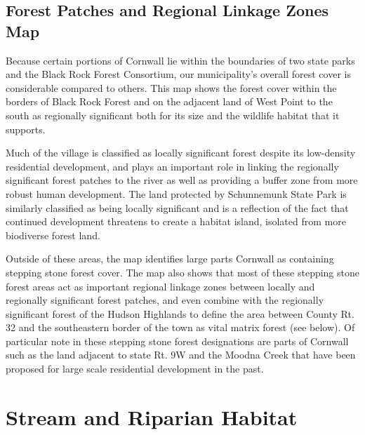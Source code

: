 \subsection*{Forest Patches and Regional Linkage Zones Map}
\label{subsec:forestpatchesandreglinkagezonesmap}
Because certain portions of Cornwall lie within the boundaries of two state
parks and the Black Rock Forest Consortium, our municipality’s overall forest
cover is considerable compared to others. This map shows the forest cover
within the borders of Black Rock Forest and on the adjacent land of West Point
to the south as regionally significant both for its size and the wildlife
habitat that it supports.
\par
Much of the village is classified as locally significant forest despite its
low-density residential development, and plays an important role in linking the
regionally significant forest patches to the river as well as providing a
buffer zone from more robust human development. The land protected by
Schunnemunk State Park is similarly classified as being locally significant and
is a reflection of the fact that continued development threatens to create a
habitat island, isolated from more biodiverse forest land.
\par
Outside of these areas, the map identifies large parts Cornwall as containing
stepping stone forest cover. The map also shows that most of these stepping
stone forest areas act as important regional linkage zones between locally and
regionally significant forest patches, and even combine with the regionally
significant forest of the Hudson Highlands to define the area between County
Rt. 32 and the southeastern border of the town as vital matrix forest (see
below). Of particular note in these stepping stone forest designations are
parts of Cornwall such as the land adjacent to state Rt. 9W and the Moodna
Creek that have been proposed for large scale residential development in the
past.

\label{map:forestpatches}

\section{Stream and Riparian Habitat}\label{subsec:streamandriparianhabitat}
